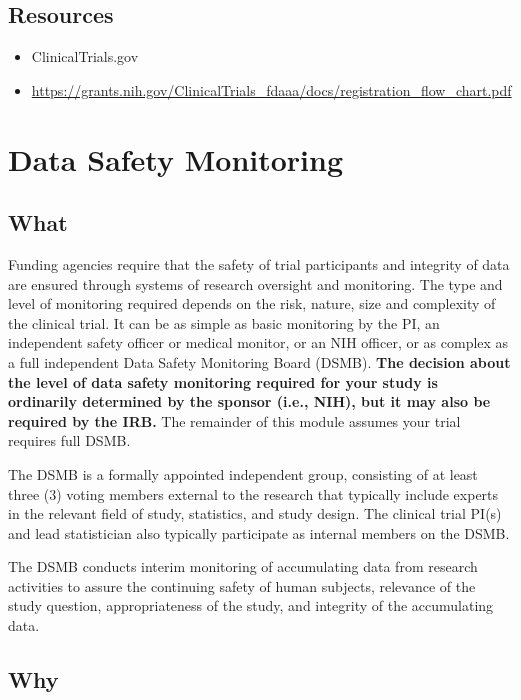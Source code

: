 \documentclass[]{book}
\providecommand{\tightlist}{%
  \setlength{\itemsep}{0pt}\setlength{\parskip}{0pt}}
\begin{document}
\subsection{Resources}\label{resources-7}

\begin{itemize}
\tightlist
\item
  ClinicalTrials.gov
\item
  \url{https://grants.nih.gov/ClinicalTrials_fdaaa/docs/registration_flow_chart.pdf}
\end{itemize}

\section{Data Safety Monitoring}\label{data-safety-monitoring}

\subsection{What}\label{what-9}

Funding agencies require that the safety of trial participants and
integrity of data are ensured through systems of research oversight and
monitoring. The type and level of monitoring required depends on the
risk, nature, size and complexity of the clinical trial. It can be as
simple as basic monitoring by the PI, an independent safety officer or
medical monitor, or an NIH officer, or as complex as a full independent
Data Safety Monitoring Board (DSMB). \textbf{The decision about the
level of data safety monitoring required for your study is ordinarily
determined by the sponsor (i.e., NIH), but it may also be required by
the IRB.} The remainder of this module assumes your trial requires full
DSMB.

The DSMB is a formally appointed independent group, consisting of at
least three (3) voting members external to the research that typically
include experts in the relevant field of study, statistics, and study
design. The clinical trial PI(s) and lead statistician also typically
participate as internal members on the DSMB.

The DSMB conducts interim monitoring of accumulating data from research
activities to assure the continuing safety of human subjects, relevance
of the study question, appropriateness of the study, and integrity of
the accumulating data.

\subsection{Why}\label{why-9}
\end{document}
